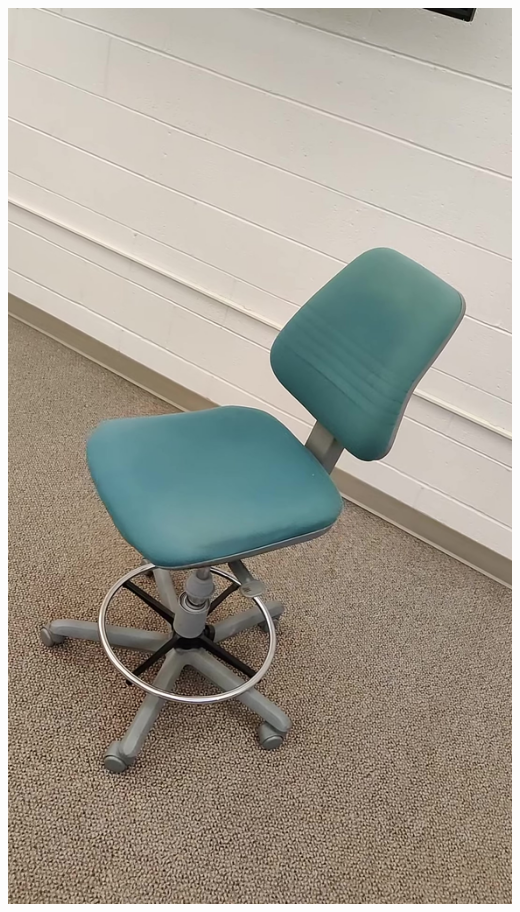 \documentclass{article}
\begin{document}
\begin{center}
    \includegraphics[scale=0.04]{images/chair3.jpg}

\end{center}
\end{document}
